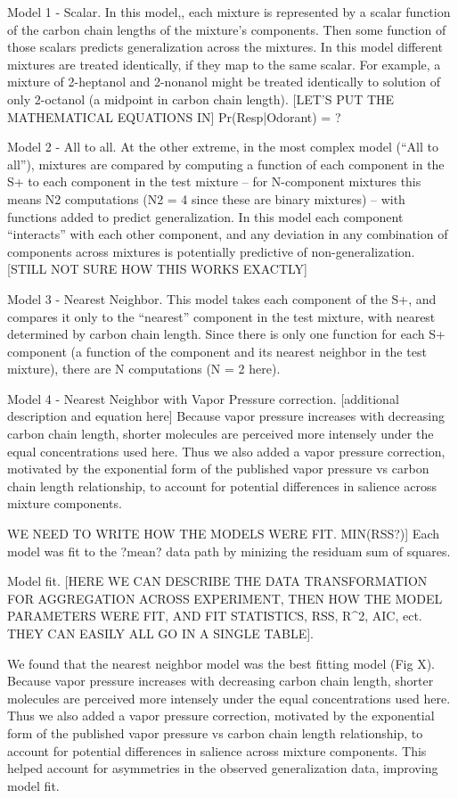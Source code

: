 Model 1 - Scalar. In this model,, each mixture is represented by a scalar function of the carbon chain lengths of the mixture’s components.  Then some function of those scalars predicts generalization across the mixtures.  In this model different mixtures are treated identically, if they map to the same scalar.  For example, a mixture of 2-heptanol and 2-nonanol might be treated identically to solution of only 2-octanol (a midpoint in carbon chain length).  [LET’S PUT THE  MATHEMATICAL EQUATIONS IN]
Pr(Resp|Odorant) =  ? 

Model 2 - All to all.
At the other extreme, in the most complex model (“All to all”), mixtures are compared by computing a function of each component in the S+ to each component in the test mixture -- for N-component mixtures this means N2 computations (N2 = 4 since these are binary mixtures) -- with functions added to predict generalization.  In this model each component “interacts” with each other component, and any deviation in any combination of components across mixtures is potentially predictive of non-generalization.  
[STILL NOT SURE HOW THIS WORKS EXACTLY]

Model 3 - Nearest Neighbor.
This model takes each component of the S+, and compares it only to the “nearest” component in the test mixture, with nearest determined by carbon chain length.  Since there is only one function for each S+ component (a function of the component and its nearest neighbor in the test mixture), there are N computations (N = 2 here).  

Model 4 - Nearest Neighbor with Vapor Pressure correction. 
[additional description and equation here] 
Because vapor pressure increases with decreasing carbon chain length, shorter molecules are perceived more intensely under the equal concentrations used here.  Thus we also added a vapor pressure correction, motivated by the exponential form of the published vapor pressure vs carbon chain length relationship, to account for potential differences in salience across mixture components. 

WE NEED TO WRITE HOW THE MODELS WERE FIT. MIN(RSS?)] Each model was fit to the ?mean? data path by minizing the residuam sum of squares.

Model fit. [HERE WE CAN DESCRIBE THE DATA TRANSFORMATION FOR AGGREGATION ACROSS EXPERIMENT, THEN HOW THE MODEL PARAMETERS WERE FIT, AND FIT STATISTICS, RSS, R^2, AIC, ect. THEY CAN EASILY ALL GO IN A SINGLE TABLE]. 

We found that the nearest neighbor model was the best fitting model (Fig X).  Because vapor pressure increases with decreasing carbon chain length, shorter molecules are perceived more intensely under the equal concentrations used here.  Thus we also added a vapor pressure correction, motivated by the exponential form of the published vapor pressure vs carbon chain length relationship, to account for potential differences in salience across mixture components.  This helped account for asymmetries in the observed generalization data, improving model fit.  